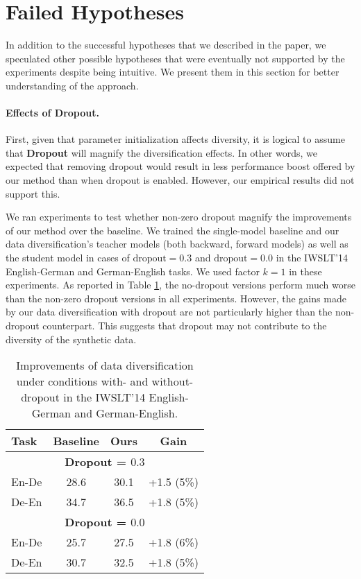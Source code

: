 \documentclass{article}
\begin{document}
\section{Failed Hypotheses}\label{app:failed_hypo}
In addition to the successful hypotheses that we described in the paper, we speculated other possible hypotheses that were eventually not supported by the experiments despite being intuitive. We present them in this section for better understanding of the approach.


\paragraph{Effects of Dropout.} 
First, given that parameter initialization affects diversity, it is logical to assume that \textbf{Dropout} will magnify the diversification effects. {In other words, we expected that removing dropout would result in less performance boost offered by our method than when dropout is enabled.} However, our empirical results did not support this.


We ran experiments to test whether non-zero dropout magnify the improvements of our method over the baseline. 
{We trained the single-model baseline and our data diversification's teacher models (both backward, forward models) as well as the student model in cases of $\text{dropout}=0.3$ and $\text{dropout}=0.0$ in the IWSLT'14 English-German and German-English tasks.}
We used factor $k=1$ in these experiments. As reported in Table \ref{table:effect_dropout}, the no-dropout versions perform much worse than the non-zero dropout versions in all experiments. However, the gains made by our data diversification with dropout are not particularly higher than the non-dropout counterpart. This suggests that dropout may not contribute to the diversity of the synthetic data. 


\begin{table}[t]
\begin{center}
\caption{Improvements of data diversification under conditions with- and without- dropout in the IWSLT'14 English-German and German-English.}
\begin{tabular}{lccc}
\toprule
{\bf Task}                  & {\bf Baseline}    & {\bf Ours}    & {\bf Gain}\\
\midrule
\multicolumn{4}{c}{\bf Dropout = $0.3$} \\
\midrule
En-De	& 28.6	& 30.1	& +1.5 (5\%)\\
De-En	& 34.7	& 36.5	& +1.8 (5\%)\\
\midrule
\multicolumn{4}{c}{\bf Dropout = $0.0$} \\
\midrule
En-De	& 25.7	& 27.5	& +1.8 (6\%)\\
De-En	& 30.7	& 32.5	& +1.8 (5\%)\\

\bottomrule
\end{tabular}
\label{table:effect_dropout}
\end{center}
\end{table}
\end{document}
